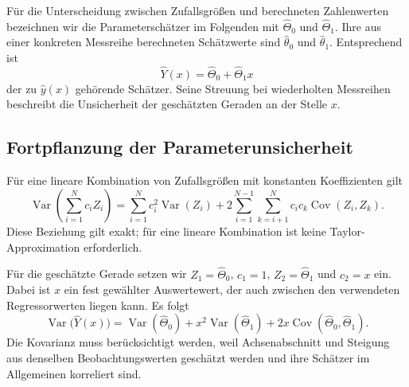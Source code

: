 Für die Unterscheidung zwischen Zufallsgrößen und berechneten
Zahlenwerten bezeichnen wir die Parameterschätzer im Folgenden mit
$\widehat{\Theta}_0$ und $\widehat{\Theta}_1$. Ihre aus einer konkreten
Messreihe berechneten Schätzwerte sind
$\widehat{\theta}_0$ und $\widehat{\theta}_1$. Entsprechend ist
\begin{equation}
  \widehat{Y}(x)
  =\widehat{\Theta}_0+\widehat{\Theta}_1 x
\end{equation}
der zu $\widehat{y}(x)$ gehörende Schätzer. Seine Streuung bei
wiederholten Messreihen beschreibt die Unsicherheit der geschätzten
Geraden an der Stelle $x$.

\subsection{Fortpflanzung der Parameterunsicherheit}

Für eine lineare Kombination von Zufallsgrößen mit konstanten
Koeffizienten gilt
\begin{equation}
  \operatorname{Var}\left(\sum_{i=1}^{N}c_i Z_i\right)
  =
  \sum_{i=1}^{N}c_i^2\operatorname{Var}(Z_i)
  +2\sum_{i=1}^{N-1}\sum_{k=i+1}^{N}
    c_i c_k\operatorname{Cov}(Z_i,Z_k).
  \label{eq:band_varianz_linearkombination}
\end{equation}
Diese Beziehung gilt exakt; für eine lineare Kombination ist keine
Taylor-Approximation erforderlich.

Für die geschätzte Gerade setzen wir
$Z_1=\widehat{\Theta}_0$, $c_1=1$,
$Z_2=\widehat{\Theta}_1$ und $c_2=x$ ein.
Dabei ist $x$ ein fest gewählter Auswertewert, der auch zwischen den
verwendeten Regressorwerten liegen kann. Es folgt
\begin{equation}
  \operatorname{Var}\bigl(\widehat{Y}(x)\bigr)
  =
  \operatorname{Var}(\widehat{\Theta}_0)
  +x^2\operatorname{Var}(\widehat{\Theta}_1)
  +2x\operatorname{Cov}
    (\widehat{\Theta}_0,\widehat{\Theta}_1).
  \label{eq:band_parameterfortpflanzung}
\end{equation}
Die Kovarianz muss berücksichtigt werden, weil Achsenabschnitt und
Steigung aus denselben Beobachtungswerten geschätzt werden und ihre
Schätzer im Allgemeinen korreliert sind.

